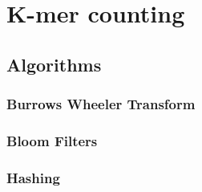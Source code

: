 \chapter{K-mer counting}


\section{Algorithms}

\subsection{Burrows Wheeler Transform}

\subsection{Bloom Filters}

\subsection{Hashing}

